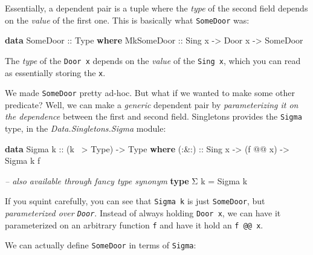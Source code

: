 \documentclass[]{article}
\newenvironment{Shaded}{}{}
\newcommand{\CommentTok}[1]{\textcolor[rgb]{0.38,0.63,0.69}{\textit{#1}}}
\newcommand{\DataTypeTok}[1]{\textcolor[rgb]{0.56,0.13,0.00}{#1}}
\newcommand{\FunctionTok}[1]{\textcolor[rgb]{0.02,0.16,0.49}{#1}}
\newcommand{\KeywordTok}[1]{\textcolor[rgb]{0.00,0.44,0.13}{\textbf{#1}}}
\newcommand{\NormalTok}[1]{#1}
\newcommand{\OtherTok}[1]{\textcolor[rgb]{0.00,0.44,0.13}{#1}}
\begin{document}
Essentially, a dependent pair is a tuple where the \emph{type} of the second
field depends on the \emph{value} of the first one. This is basically what
\texttt{SomeDoor} was:

\begin{Shaded}
\begin{Highlighting}[]
\KeywordTok{data} \DataTypeTok{SomeDoor}\OtherTok{ ::} \DataTypeTok{Type} \KeywordTok{where}
    \DataTypeTok{MkSomeDoor}\OtherTok{ ::} \DataTypeTok{Sing}\NormalTok{ x }\OtherTok{->} \DataTypeTok{Door}\NormalTok{ x }\OtherTok{->} \DataTypeTok{SomeDoor}
\end{Highlighting}
\end{Shaded}

The \emph{type} of the \texttt{Door\ x} depends on the \emph{value} of the
\texttt{Sing\ x}, which you can read as essentially storing the \texttt{x}.

We made \texttt{SomeDoor} pretty ad-hoc. But what if we wanted to make some
other predicate? Well, we can make a \emph{generic} dependent pair by
\emph{parameterizing it on the dependence} between the first and second field.
Singletons provides the \texttt{Sigma} type, in the \emph{Data.Singletons.Sigma}
module:

\begin{Shaded}
\begin{Highlighting}[]
\KeywordTok{data} \DataTypeTok{Sigma}\OtherTok{ k ::}\NormalTok{ (k }\FunctionTok{~>} \DataTypeTok{Type}\NormalTok{) }\OtherTok{->} \DataTypeTok{Type} \KeywordTok{where}
\OtherTok{    (:&:) ::} \DataTypeTok{Sing}\NormalTok{ x }\OtherTok{->}\NormalTok{ (f }\FunctionTok{@@}\NormalTok{ x) }\OtherTok{->} \DataTypeTok{Sigma}\NormalTok{ k f}

\CommentTok{-- also available through fancy type synonym}
\KeywordTok{type}\NormalTok{ Σ k }\FunctionTok{=} \DataTypeTok{Sigma}\NormalTok{ k}
\end{Highlighting}
\end{Shaded}

If you squint carefully, you can see that \texttt{Sigma\ k} is just
\texttt{SomeDoor}, but \emph{parameterized over \texttt{Door}}. Instead of
always holding \texttt{Door\ x}, we can have it parameterized on an arbitrary
function \texttt{f} and have it hold an \texttt{f\ @@\ x}.

We can actually define \texttt{SomeDoor} in terms of \texttt{Sigma}:
\end{document}
